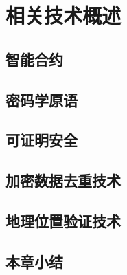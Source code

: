 \chapter{相关技术概述}

\section{智能合约}

\section{密码学原语}

\section{可证明安全}

\section{加密数据去重技术}

\section{地理位置验证技术}

\section{本章小结}

\endinput